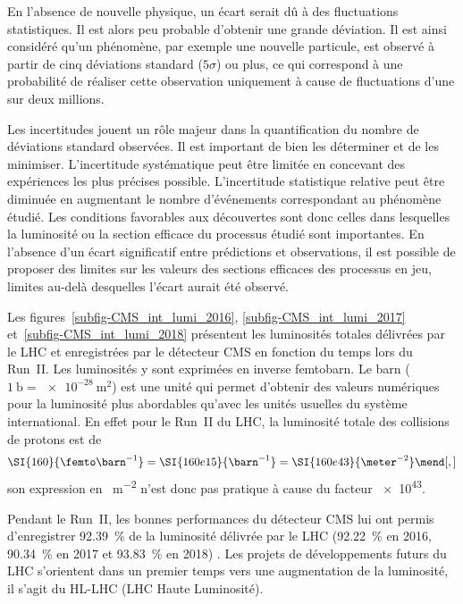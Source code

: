 En l'absence de nouvelle physique, un écart serait dû à des fluctuations statistiques.
Il est alors peu probable d'obtenir une grande déviation.
Il est ainsi considéré qu'un phénomène, par exemple une nouvelle particule, est observé à partir de cinq déviations standard ($5\sigma$) ou plus, ce qui correspond à une probabilité de réaliser cette observation uniquement à cause de fluctuations d'une sur deux millions.
\par
Les incertitudes jouent un rôle majeur dans la quantification du nombre de déviations standard observées.
Il est important de bien les déterminer et de les minimiser.
L'incertitude systématique peut être limitée en concevant des expériences les plus précises possible.
L'incertitude statistique relative peut être diminuée en augmentant le nombre d'événements correspondant au phénomène étudié.
Les conditions favorables aux découvertes sont donc celles dans lesquelles la luminosité ou la section efficace du processus étudié sont importantes.
En l'absence d'un écart significatif entre prédictions et observations, il est possible de proposer des limites sur les valeurs des sections efficaces des processus en jeu, limites au-delà desquelles l'écart aurait été observé.
\par Les figures~\ref{subfig-CMS_int_lumi_2016}, \ref{subfig-CMS_int_lumi_2017} et~\ref{subfig-CMS_int_lumi_2018} présentent les luminosités totales délivrées par le LHC et enregistrées par le détecteur CMS en fonction du temps lors du Run~II.
Les luminosités y sont exprimées en inverse femtobarn.
Le barn ($\SI{1}{\barn}=\SI{e-28}{\meter^2}$) est une unité qui permet d'obtenir des valeurs numériques pour la luminosité plus abordables qu'avec les unités usuelles du système international.
En effet pour le Run~II du LHC, la luminosité totale des collisions de protons est de
\begin{equation}
\SI{160}{\femto\barn^{-1}} = \SI{160e15}{\barn^{-1}} = \SI{160e43}{\meter^{-2}}
\mend[,]
\end{equation}
son expression en \SI{}{\meter^{-2}} n'est donc pas pratique à cause du facteur \num{e43}.
\par Pendant le Run~II, les bonnes performances du détecteur CMS lui ont permis d'enregistrer \SI{92.39}{\%} de la luminosité délivrée par le LHC (\SI{92.22}{\%} en 2016, \SI{90.34}{\%} en 2017 et \SI{93.83}{\%} en 2018) \cite{CMS-PAS-LUM-17-001,CMS-PAS-LUM-17-004,CMS-PAS-LUM-18-002}.
Les projets de développements futurs du LHC s'orientent dans un premier temps vers une augmentation de la luminosité, il s'agit du \og HL-LHC \fg{} (LHC Haute Luminosité).
